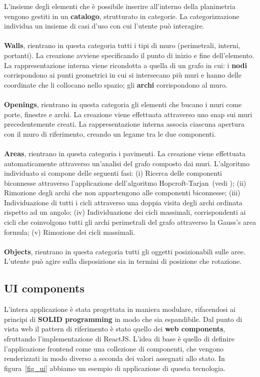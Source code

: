 L'insieme degli elementi che \`e possibile inserire all'interno della planimetria vengono gestiti in un \textbf{catalogo}, strutturato in categorie.
La categorizzazione individua un insieme di casi d'uso con cui l'utente pu\`o interagire.\\\\
\textbf{Walls}, rientrano in questa categoria tutti i tipi di muro (perimetrali, interni, portanti). La creazione avviene specificando il punto di inizio e fine dell'elemento. La rappresentazione interna viene ricondotta a quella di un grafo in cui: i \textbf{nodi} corrispondono ai punti geometrici in cui si intersecano pi\`u muri e hanno delle coordinate che li collocano nello spazio; gli \textbf{archi} corrispondono al muro.\\\\
\textbf{Openings}, rientrano in questa categoria gli elementi che bucano i muri come porte, finestre e archi. La creazione viene effettuata attraverso uno snap sui muri precedentemente creati. La rappresentazione interna associa ciascuna apertura con il muro di riferimento, creando un legame tra le due componenti.\\\\
\textbf{Areas}, rientrano in questa categoria i pavimenti. La creazione viene effettuata automaticamente attraverso un'analisi del grafo composto dai muri. L'algoritmo individuato si compone delle seguenti fasi: (i) Ricerca delle componenti biconnesse attraverso l'applicazione dell'algoritmo Hopcroft-Tarjan~(vedi \cite{Hopcroft:1973:AEA:362248.362272}); 
(ii) Rimozione degli archi che non appartengono alle componenti biconnesse; 
(iii) Individuazione di tutti i cicli attraverso una doppia visita degli archi ordinata rispetto ad un angolo;
(iv) Individuazione dei cicli massimali, corrispondenti ai cicli che coinvolgono tutti gli archi perimetrali del grafo attraverso la Gauss's area formula;
(v) Rimozione dei cicli massimali.\\\\
\textbf{Objects}, rientrano in questa categoria tutti gli oggetti posizionabili sulle aree. L'utente pu\`o agire sulla disposizione sia in termini di posizione che rotazione.\\

\subsection{UI components}

L'intera applicazione \`e stata progettata in maniera modulare, rifacendosi ai principi di \textbf{SOLID programming} in modo che sia espandibile. Dal punto di vista web il pattern di riferimento \`e stato quello dei \textbf{web components}, sfruttando l'implementazione di ReactJS. L'idea di base \`e quello di definire l'applicazione frontend come una collezione di componenti, che vengono renderizzati in modo diverso a seconda dei valori assegnati allo stato. In figura~\ref{fig_ui} abbiamo un esempio di applicazione di questa tecnologia. \\


